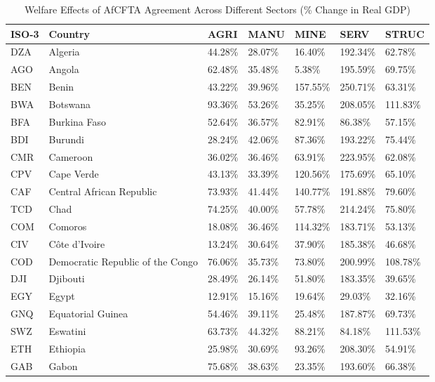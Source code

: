 \begin{table}[htbp]
\centering
\caption{Welfare Effects of AfCFTA Agreement Across Different Sectors (\% Change in Real GDP)} 
\label{tab:welfare}
\begingroup\small
\begin{tabular}{lllllll}
  \hline
ISO-3 & Country & AGRI & MANU & MINE & SERV & STRUC \\ 
  \hline
DZA & Algeria & 44.28\% & 28.07\% & 16.40\% & 192.34\% & 62.78\% \\ 
  AGO & Angola & 62.48\% & 35.48\% & 5.38\% & 195.59\% & 69.75\% \\ 
  BEN & Benin & 43.22\% & 39.96\% & 157.55\% & 250.71\% & 63.31\% \\ 
  BWA & Botswana & 93.36\% & 53.26\% & 35.25\% & 208.05\% & 111.83\% \\ 
  BFA & Burkina Faso & 52.64\% & 36.57\% & 82.91\% & 86.38\% & 57.15\% \\ 
  BDI & Burundi & 28.24\% & 42.06\% & 87.36\% & 193.22\% & 75.44\% \\ 
  CMR & Cameroon & 36.02\% & 36.46\% & 63.91\% & 223.95\% & 62.08\% \\ 
  CPV & Cape Verde & 43.13\% & 33.39\% & 120.56\% & 175.69\% & 65.10\% \\ 
  CAF & Central African Republic & 73.93\% & 41.44\% & 140.77\% & 191.88\% & 79.60\% \\ 
  TCD & Chad & 74.25\% & 40.00\% & 57.78\% & 214.24\% & 75.80\% \\ 
  COM & Comoros & 18.08\% & 36.46\% & 114.32\% & 183.71\% & 53.13\% \\ 
  CIV & Côte d’Ivoire & 13.24\% & 30.64\% & 37.90\% & 185.38\% & 46.68\% \\ 
  COD & Democratic Republic of the Congo & 76.06\% & 35.73\% & 73.80\% & 200.99\% & 108.78\% \\ 
  DJI & Djibouti & 28.49\% & 26.14\% & 51.80\% & 183.35\% & 39.65\% \\ 
  EGY & Egypt & 12.91\% & 15.16\% & 19.64\% & 29.03\% & 32.16\% \\ 
  GNQ & Equatorial Guinea & 54.46\% & 39.11\% & 25.48\% & 187.87\% & 69.73\% \\ 
  SWZ & Eswatini & 63.73\% & 44.32\% & 88.21\% & 84.18\% & 111.53\% \\ 
  ETH & Ethiopia & 25.98\% & 30.69\% & 93.26\% & 208.30\% & 54.91\% \\ 
  GAB & Gabon & 75.68\% & 38.63\% & 23.35\% & 193.60\% & 66.38\% \\ 

\end{tabular}
\end{table}
